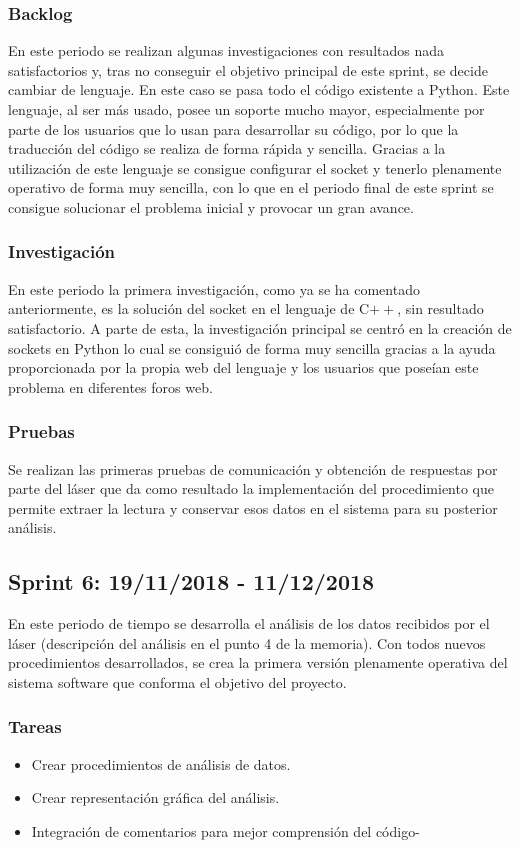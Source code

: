 \subsubsection{Backlog}
En este periodo se realizan algunas investigaciones con resultados nada satisfactorios y, tras no conseguir el objetivo principal de este sprint, se decide cambiar de lenguaje. En este caso se pasa todo el código existente a Python. Este lenguaje, al ser más usado, posee un soporte mucho mayor, especialmente por parte de los usuarios que lo usan para desarrollar su código, por lo que la traducción del código se realiza de forma rápida y sencilla. Gracias a la utilización de este lenguaje se consigue configurar el socket y tenerlo plenamente operativo de forma muy sencilla, con lo que en el periodo final de este sprint se consigue solucionar el problema inicial y provocar un gran avance.
\subsubsection{Investigación}
En este periodo la primera investigación, como ya se ha comentado anteriormente, es la solución del socket en el lenguaje de C$++$, sin resultado satisfactorio. A parte de esta, la investigación principal se centró en la creación de sockets en Python lo cual se consiguió de forma muy sencilla gracias a la ayuda proporcionada por la propia web del lenguaje y los usuarios que poseían este problema en diferentes foros web.
\subsubsection{Pruebas}
Se realizan las primeras pruebas de comunicación y obtención de respuestas por parte del láser que da como resultado la implementación del procedimiento que permite extraer la lectura y conservar esos datos en el sistema para su posterior análisis.

\subsection{Sprint 6: 19/11/2018 - 11/12/2018}
En este periodo de tiempo se desarrolla el análisis de los datos recibidos por el láser (descripción del análisis en el punto 4 de la memoria). Con todos nuevos procedimientos desarrollados, se crea la primera versión plenamente operativa del sistema software que conforma el objetivo del proyecto.
\subsubsection{Tareas}
\begin{itemize}
	\item Crear procedimientos de análisis de datos.
	\item Crear representación gráfica del análisis.
	\item Integración de comentarios para mejor comprensión del código-
\end{itemize}
